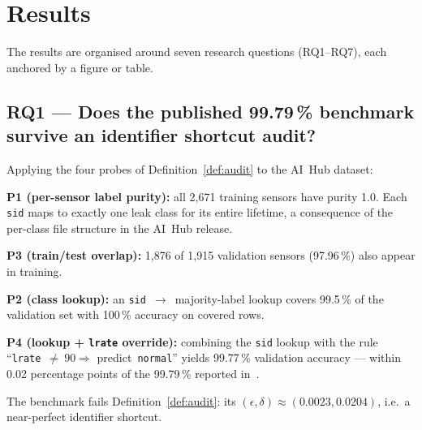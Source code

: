 \documentclass[3p,times,authoryear]{elsarticle}
\theoremstyle{remark}
\begin{document}
\section{Results}\label{sec:results}

The results are organised around seven research questions
(RQ1--RQ7), each anchored by a figure or table.

\subsection{RQ1 --- Does the published 99.79\,\% benchmark survive
an identifier shortcut audit?}\label{sec:res-rq1}

Applying the four probes of Definition~\ref{def:audit} to the
AI~Hub dataset:

\textbf{P1 (per-sensor label purity):} all 2{,}671 training
sensors have purity 1.0. Each \texttt{sid} maps to exactly one
leak class for its entire lifetime, a consequence of the
per-class file structure in the AI~Hub release.

\textbf{P3 (train/test overlap):} 1{,}876 of 1{,}915
validation sensors (97.96\,\%) also appear in training.

\textbf{P2 (class lookup):} an
\texttt{sid}~$\to$~majority-label lookup covers 99.5\,\% of the
validation set with 100\,\% accuracy on covered rows.

\textbf{P4 (lookup + \texttt{lrate} override):} combining the
\texttt{sid} lookup with the rule
``\texttt{lrate}~$\neq~90 \Rightarrow$ predict~\texttt{normal}''
yields 99.77\,\% validation accuracy --- within 0.02 percentage
points of the 99.79\,\% reported in~\cite{lee2023leak}.

The benchmark fails Definition~\ref{def:audit}: its
$(\epsilon, \delta) \approx (0.0023, 0.0204)$, i.e.\ a
near-perfect identifier shortcut.
\end{document}
